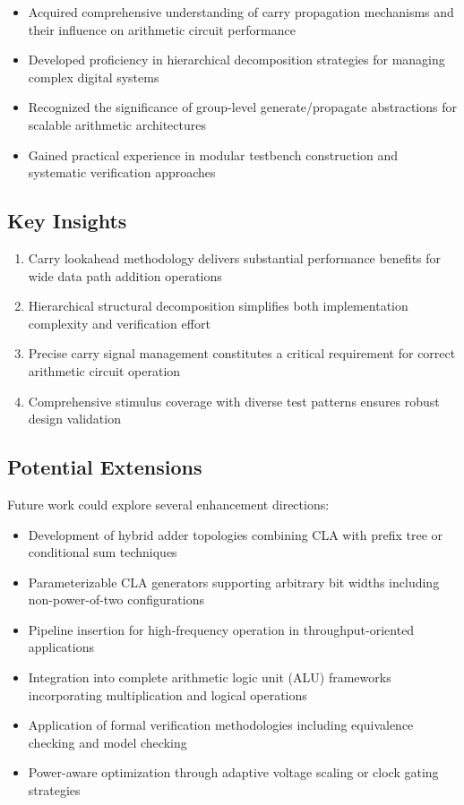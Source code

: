 \documentclass[a4paper, 11pt]{article}
\begin{document}
\begin{itemize}
\begin{itemize}
    \item Acquired comprehensive understanding of carry propagation mechanisms and their influence on arithmetic circuit performance
    \item Developed proficiency in hierarchical decomposition strategies for managing complex digital systems
    \item Recognized the significance of group-level generate/propagate abstractions for scalable arithmetic architectures
    \item Gained practical experience in modular testbench construction and systematic verification approaches
\end{itemize}

\subsection{Key Insights}

\begin{enumerate}
    \item Carry lookahead methodology delivers substantial performance benefits for wide data path addition operations
    \item Hierarchical structural decomposition simplifies both implementation complexity and verification effort
    \item Precise carry signal management constitutes a critical requirement for correct arithmetic circuit operation
    \item Comprehensive stimulus coverage with diverse test patterns ensures robust design validation
\end{enumerate}

\subsection{Potential Extensions}

Future work could explore several enhancement directions:

\begin{itemize}
    \item Development of hybrid adder topologies combining CLA with prefix tree or conditional sum techniques
    \item Parameterizable CLA generators supporting arbitrary bit widths including non-power-of-two configurations
    \item Pipeline insertion for high-frequency operation in throughput-oriented applications
    \item Integration into complete arithmetic logic unit (ALU) frameworks incorporating multiplication and logical operations
    \item Application of formal verification methodologies including equivalence checking and model checking
    \item Power-aware optimization through adaptive voltage scaling or clock gating strategies
\end{itemize}


\end{itemize}
\end{document}
